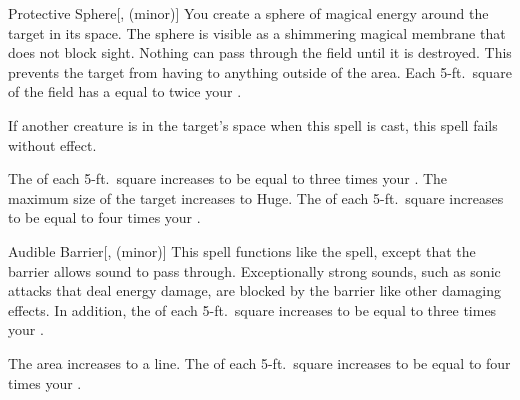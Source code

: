 \lowercase{\hypertarget{spell:Protective Sphere}{}}\label{spell:Protective Sphere}
\begin{freeability}[Rank 1]{\hypertarget{spell:Protective Sphere}{Protective Sphere}}[,  (minor)]
You create a sphere of magical energy around the target in its space.
The sphere is visible as a shimmering magical membrane that does not block sight.
Nothing can pass through the field until it is destroyed.
This prevents the target from having  to anything outside of the area.
Each 5-ft.\ square of the field has a  equal to twice your .

If another creature is in the target's space when this spell is cast, this spell fails without effect.

\rankline
{} The  of each 5-ft.\ square increases to be equal to three times your .
 The maximum size of the target increases to Huge.
 The  of each 5-ft.\ square increases to be equal to four times your .
\end{freeability}
\vspace{0.25em}



\lowercase{\hypertarget{spell:Audible Barrier}{}}\label{spell:Audible Barrier}
\begin{freeability}[Rank 3]{\hypertarget{spell:Audible Barrier}{Audible Barrier}}[,  (minor)]
\targetrule
This spell functions like the  spell, except that the barrier allows sound to pass through.
Exceptionally strong sounds, such as sonic attacks that deal energy damage, are blocked by the barrier like other damaging effects.
In addition, the  of each 5-ft.\ square increases to be equal to three times your .

 The area increases to a \arealarge line.
 The  of each 5-ft.\ square increases to be equal to four times your .
\end{freeability}
\vspace{0.25em}




